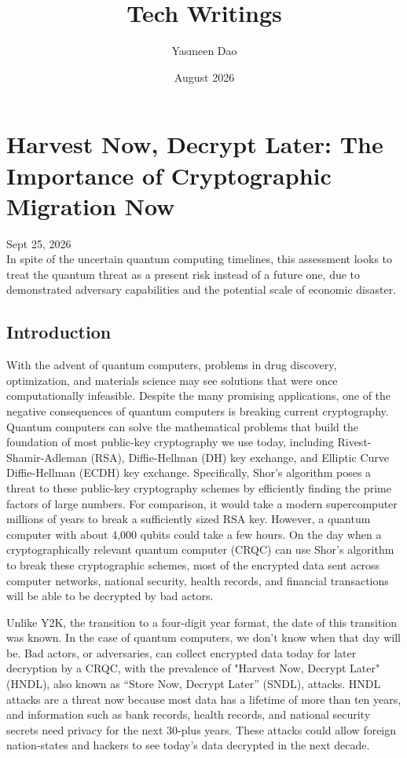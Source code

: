 \documentclass{article}
\title{Tech Writings}
\author{Yasmeen Dao}
\date{August 2026}
\begin{document}
\maketitle
\tableofcontents 

\clearpage

\section{Harvest Now, Decrypt Later: The Importance of Cryptographic Migration Now}
Sept 25, 2026 \\

In spite of the uncertain quantum computing timelines, this assessment looks to treat the quantum threat as a present risk instead of a future one, due to demonstrated adversary capabilities and the potential scale of economic disaster. 

\subsection{Introduction}

With the advent of quantum computers, problems in drug discovery, optimization, and materials science may see solutions that were once computationally infeasible. Despite the many promising applications, one of the negative consequences of quantum computers is breaking current cryptography. Quantum computers can solve the mathematical problems that build the foundation of most public-key cryptography we use today, including Rivest-Shamir-Adleman (RSA), Diffie-Hellman (DH) key exchange, and Elliptic Curve Diffie-Hellman (ECDH) key exchange. Specifically, Shor's algorithm poses a threat to these public-key cryptography schemes by efficiently finding the prime factors of large numbers. For comparison, it would take a modern supercomputer millions of years to break a sufficiently sized RSA key. However, a quantum computer with about 4,000 qubits could take a few hours. On the day when a cryptographically relevant quantum computer (CRQC) can use Shor's algorithm to break these cryptographic schemes, most of the encrypted data sent across computer networks, national security, health records, and financial transactions will be able to be decrypted by bad actors. 

Unlike Y2K, the transition to a four-digit year format, the date of this transition was known. In the case of quantum computers, we don't know when that day will be. Bad actors, or adversaries, can collect encrypted data today for later decryption by a CRQC, with the prevalence of "Harvest Now, Decrypt Later" (HNDL), also known as “Store Now, Decrypt Later” (SNDL), attacks. HNDL attacks are a threat now because most data has a lifetime of more than ten years, and information such as bank records, health records, and national security secrets need privacy for the next 30-plus years. These attacks could allow foreign nation-states and hackers to see today's data decrypted in the next decade. 
\end{document}
